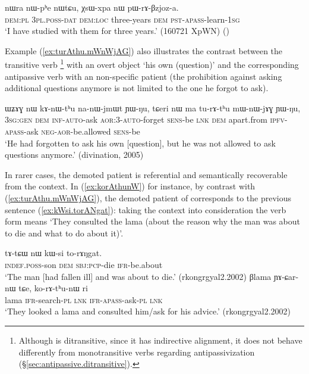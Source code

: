 \begin{exe}
\ex \label{ex:pWrABzjoza}
\gll nɯra nɯ-pʰe nɯtɕu, χsɯ-xpa nɯ pɯ-rɤ-βzjoz-a. \\
\textsc{dem}:\textsc{pl} \textsc{3pl}.\textsc{poss}-\textsc{dat} \textsc{dem}:\textsc{loc} three-years \textsc{dem} \textsc{pst}-\textsc{apass}-learn-\textsc{1sg} \\
\glt `I have studied with them for three years.' (160721 XpWN) ()
\end{exe}

Example (\ref{ex:turAthu.mWnWjAG}) also illustrates the contrast between the transitive verb \footnote{Although  is ditransitive, since it has indirective alignment, it does not behave differently from monotransitive verbs regarding antipassivization (§\ref{sec:antipassive.ditransitive}). } with an overt object  `his own (question)' and the corresponding antipassive verb  with an non-specific patient (the prohibition against asking additional questions anymore is not limited to the one he forgot to ask).

\begin{exe}
\ex \label{ex:turAthu.mWnWjAG}
\gll   ɯʑɤɣ nɯ kɤ-nɯ-tʰu na-nɯ-jmɯt ɲɯ-ŋu, tɕeri nɯ ma tu-rɤ-tʰu mɯ-nɯ-jɤɣ ɲɯ-ŋu, \\
\textsc{3sg}:\textsc{gen} \textsc{dem} \textsc{inf}-\textsc{auto}-ask \textsc{aor}:3\flobv{}-\textsc{auto}-forget \textsc{sens}-be \textsc{lnk} \textsc{dem} apart.from \textsc{ipfv}-\textsc{apass}-ask \textsc{neg}-\textsc{aor}-be.allowed \textsc{sens}-be \\
\glt `He had forgotten to ask his own [question], but he was not allowed to ask questions anymore.' (divination, 2005)
\end{exe}


In rarer cases, the demoted patient is referential and semantically recoverable from the context. In (\ref{ex:korAthunW}) for instance, by contrast with (\ref{ex:turAthu.mWnWjAG}), the demoted patient of   corresponds to the previous sentence (\ref{ex:kWsi.torANgat}): taking the context into consideration the verb form  means `They consulted the lama (about the reason why the man was about to die and what to do about it)'.

\begin{exe}
\ex 
\begin{xlist}
\ex \label{ex:kWsi.torANgat} 
\gll tɤ-tɕɯ nɯ kɯ-si to-rɤŋgat. \\
\textsc{indef}.\textsc{poss}-son \textsc{dem} \textsc{sbj}:\textsc{pcp}-die \textsc{ifr}-be.about \\
\glt `The man [had fallen ill] and was about to die.' (rkongrgyal2.2002)
\ex \label{ex:korAthunW} 
\gll  βlama ɲɤ-ɕar-nɯ tɕe, ko-rɤ-tʰu-nɯ ri \\
lama \textsc{ifr}-search-\textsc{pl} \textsc{lnk} \textsc{ifr}-\textsc{apass}-ask-\textsc{pl} \textsc{lnk} \\
\glt `They looked a lama and consulted him/ask for his advice.' (rkongrgyal2.2002)
\end{xlist}
\end{exe}

